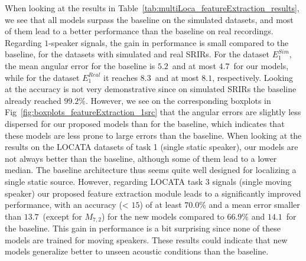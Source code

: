 When looking at the results in Table~\ref{tab:multiLoca_featureExtraction_results}, we see that all models surpass the baseline on the simulated datasets, and most of them lead to a better performance than the baseline on real recordings. Regarding $1$-speaker signals, the gain in performance is small compared to the baseline, for the datasets with simulated and real SRIRs. For the dataset $E^{Sim}_1$, the mean angular error for the baseline is $5.2$\textdegree~and at most $4.7$\textdegree~for our models, while for the dataset $E^{Real}_1$ it reaches $8.3$\textdegree~and at most $8.1$\textdegree, respectively. Looking at the accuracy is not very demonstrative since on simulated SRIRs the baseline already reached $99.2$\%. However, we see on the corresponding boxplots in Fig~\ref{fig:boxplots_featureExtraction_1src} that the angular errors are slightly less dispersed for our proposed models than for the baseline, which indicates that these models are less prone to large errors than the baseline. When looking at the results on the LOCATA datasets of task 1 (single static speaker), our models are not always better than the baseline, although some of them lead to a lower median. The baseline architecture thus seems quite well designed for localizing a single static source. However, regarding LOCATA task 3 signals (single moving speaker) our proposed feature extraction module leads to a significantly improved performance, with an accuracy (< $15$\textdegree) of at least $70.0$\% and a mean error smaller than $13.7$\textdegree~(except for $M_{7,2}$) for the new models compared to $66.9$\% and $14.1$\textdegree~for the baseline. This gain in performance is a bit surprising since none of these models are trained for moving speakers. These results could indicate that new models generalize better to unseen acoustic conditions than the baseline.

